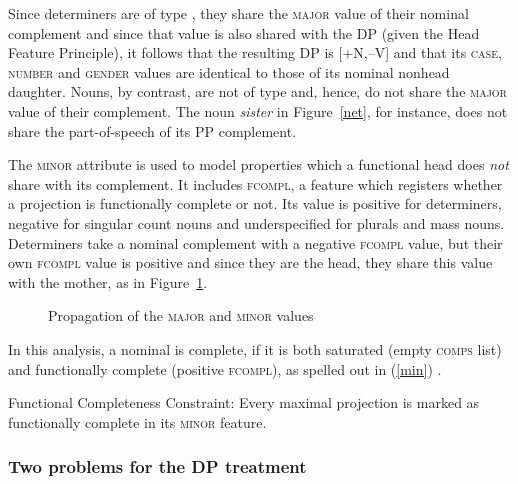 \documentclass[output=paper
	        ,collection
	        ,collectionchapter
 	        ,biblatex
                ,babelshorthands
                ,newtxmath
                ,draftmode
                ,colorlinks, citecolor=brown
]{langscibook}
\begin{document}
\noindent
Since determiners are of type , they share the \textsc{major} value of their 
nominal complement and since that value is 
also shared with the DP (given the Head Feature Principle), it follows that the resulting 
DP is [+N,--V] and that its \textsc{case}, \textsc{number} and \textsc{gender} values are 
identical to those of its nominal nonhead daughter. 
Nouns, by contrast, are not of type  and, hence, do not share the 
\textsc{major} value of their complement. The noun \emph{sister} 
in Figure~\ref{net}, for instance, does not share the part-of-speech of its PP complement. 

The \textsc{minor} attribute is used to model properties which a functional head 
does {\em not} share with its complement. It includes \textsc{fcompl}, a feature which 
registers whether a projection is functionally complete or not. Its value is positive for 
determiners, negative for singular count nouns and underspecified for plurals and mass nouns.  
Determiners take a nominal complement with a negative \textsc{fcompl} value, but their 
own \textsc{fcompl} value is positive and since they are the head, they share this value with 
the mother, as in Figure~\ref{netter}. 

\begin{figure}
\caption{\label{netter} Propagation of the \textsc{major} and \textsc{minor} values}
\end{figure}

In this analysis, a nominal is complete, if it is both saturated 
(empty \textsc{comps} list) and functionally complete (positive \textsc{fcompl}), as 
spelled out in (\ref{min}) \citep[312]{Netter94}.

\begin{exe} 
\ex\label{min} Functional Completeness Constraint: Every maximal projection is marked  
      as functionally complete in its \textsc{minor} feature. 
\end{exe}



\subsubsection{Two problems for the DP treatment}  
\label{prob}
\end{document}
